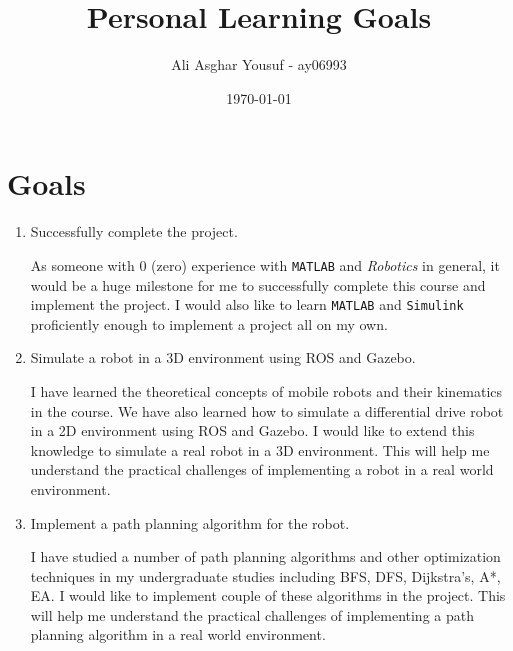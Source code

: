\documentclass[12pt]{article}
\title{Personal Learning Goals}
\author{Ali Asghar Yousuf - ay06993}
\date{\today}
\begin{document}
\maketitle

\section*{Goals}
\begin{enumerate}
    \item Successfully complete the project.

          As someone with 0 (zero) experience with \texttt{MATLAB} and \textit{Robotics}
          in general, it would be a huge milestone for me to successfully complete this
          course and implement the project. I would also like to learn \texttt{MATLAB}
          and \texttt{Simulink} proficiently enough to implement a project all on my own.

    \item Simulate a robot in a 3D environment using ROS and Gazebo.

          I have learned the theoretical concepts of mobile robots and their kinematics
          in the course. We have also learned how to simulate a differential drive robot
          in a 2D environment using ROS and Gazebo. I would like to extend this knowledge
          to simulate a real robot in a 3D environment. This will help me understand the
          practical challenges of implementing a robot in a real world environment.

    \item Implement a path planning algorithm for the robot.

          I have studied a number of path planning algorithms and other optimization
          techniques in my undergraduate studies including BFS, DFS, Dijkstra's, A*, EA. I would like
          to implement couple of these algorithms in the project. This will help me
          understand the practical challenges of implementing a path planning algorithm
          in a real world environment.
\end{enumerate}
\end{document}
